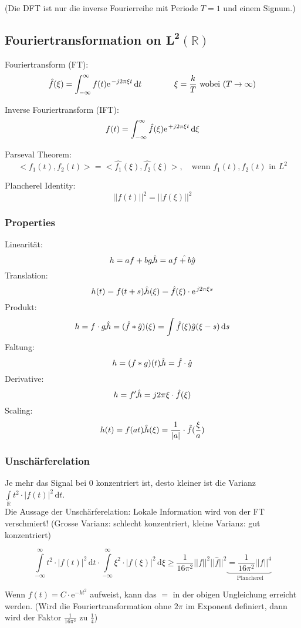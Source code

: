 (Die DFT ist nur die inverse Fourierreihe mit Periode $T=1$ und einem Signum.)

\newpage
\subsection{Fouriertransformation on $\mathbf{L^2(\mathbb{R})}$}

Fouriertransform (FT): \[ \hat{f}(\xi) = \int_{-\infty}^{\infty}f(t) \e^{-j 2\pi \xi t} \, \mathrm{d}t \qquad \qquad \xi = \frac{k}{T} \text{ wobei } (T \rightarrow \infty) \]

Inverse Fouriertransform (IFT): \[ f(t) = \int_{-\infty}^{\infty}\hat{f}(\xi) \e^{+j 2\pi \xi t} \, \mathrm{d}\xi \]

Parseval Theorem: \[ <f_1(t), f_2(t)> = <\hat{f_1}(\xi), \hat{f_2}(\xi)>, \quad \text{wenn } f_1(t), f_2(t) \text{ in } L^2\]

Plancherel Identity: \[ ||f(t)||^2 = ||\hat{f}(\xi)||^2 \]

\subsubsection{Properties}
Linearität: \[ h = af + bg \FT \hat{h} = a\hat{f + b\hat{g}} \]
Translation: \[ h(t) = f(t+s) \FT \hat{h}(\xi) = \hat{f}(\xi) \cdot \e^{j2\pi\xi s} \]
Produkt: \[ h = f \cdot g \FT \hat{h} = (\hat{f}\ast\hat{g})(\xi) = \int \hat{f}(\xi) \hat{g}(\xi - s) \,\mathrm{d}s \]
Faltung: \[ h = (f\ast g)(t) \FT \hat{h} = \hat{f} \cdot \hat{g} \]
Derivative: \[ h = f' \FT \hat{h} = j2\pi\xi\cdot\hat{f}(\xi) \]
Scaling: \[ h(t) = f(at) \FT \hat{h}(\xi) = \frac{1}{|a|} \cdot \hat{f}(\frac{\xi}{a}) \]

\subsubsection{Unschärferelation}
Je mehr das Signal bei 0 konzentriert ist, desto kleiner ist die Varianz $\int\limits_{\mathbb{R}} t^2 \cdot |f(t)|^2 \,\mathrm{d}t$.\\
Die Aussage der Unschärferelation: Lokale Information wird von der FT verschmiert!
(Grosse Varianz: schlecht konzentriert, kleine Varianz: gut konzentriert)

\[  
	\int\limits_{-\infty}^\infty t^2 \cdot |f(t)|^2 \, \mathrm{d}t \cdot \int\limits_{-\infty}^\infty \xi^2 \cdot |f(\xi)|^2 \, \mathrm{d}\xi
	\geq \frac{1}{16 \pi^2} ||f||^2||\hat{f}||^2 \underbrace{= \frac{1}{16 \pi^2} ||f||^4}_{\text{ Plancherel}}
\]

Wenn $f(t)=C \cdot \mathrm{e}^{-kt^2}$ aufweist, kann das $=$ in der obigen Ungleichung erreicht werden. (Wird die Fouriertransformation ohne $2\pi$ im Exponent definiert, dann wird der Faktor $\frac{1}{16\pi^2}$ zu $\frac{1}{4}$)

